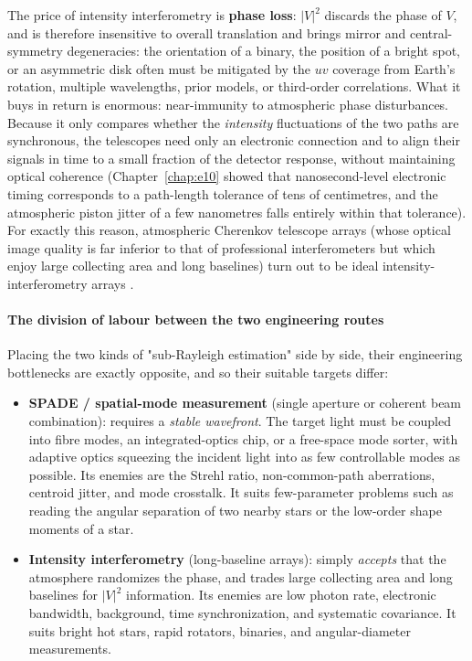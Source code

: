 The price of intensity interferometry is \textbf{phase loss}: $|V|^2$ discards the phase of $V$, and is therefore insensitive to overall translation and brings mirror and central-symmetry degeneracies: the orientation of a binary, the position of a bright spot, or an asymmetric disk often must be mitigated by the $uv$ coverage from Earth's rotation, multiple wavelengths, prior models, or third-order correlations. What it buys in return is enormous: near-immunity to atmospheric phase disturbances. Because it only compares whether the \emph{intensity} fluctuations of the two paths are synchronous, the telescopes need only an electronic connection and to align their signals in time to a small fraction of the detector response, without maintaining optical coherence (Chapter~\ref{chap:e10} showed that nanosecond-level electronic timing corresponds to a path-length tolerance of tens of centimetres, and the atmospheric piston jitter of a few nanometres falls entirely within that tolerance). For exactly this reason, atmospheric Cherenkov telescope arrays (whose optical image quality is far inferior to that of professional interferometers but which enjoy large collecting area and long baselines) turn out to be ideal intensity-interferometry arrays \citep{1956Natur.177...27B,1974MNRAS.167..121H,2020NatAs...4.1164A,2024MNRAS.529.4387A}.

\paragraph{The division of labour between the two engineering routes}
\label{sec:e12-two-roads}

Placing the two kinds of "sub-Rayleigh estimation" side by side, their engineering bottlenecks are exactly opposite, and so their suitable targets differ:

\begin{itemize}
  \item \textbf{SPADE / spatial-mode measurement} (single aperture or coherent beam combination): requires a \emph{stable wavefront}. The target light must be coupled into fibre modes, an integrated-optics chip, or a free-space mode sorter, with adaptive optics squeezing the incident light into as few controllable modes as possible. Its enemies are the Strehl ratio, non-common-path aberrations, centroid jitter, and mode crosstalk. It suits few-parameter problems such as reading the angular separation of two nearby stars or the low-order shape moments of a star.
  \item \textbf{Intensity interferometry} (long-baseline arrays): simply \emph{accepts} that the atmosphere randomizes the phase, and trades large collecting area and long baselines for $|V|^2$ information. Its enemies are low photon rate, electronic bandwidth, background, time synchronization, and systematic covariance. It suits bright hot stars, rapid rotators, binaries, and angular-diameter measurements.
\end{itemize}

